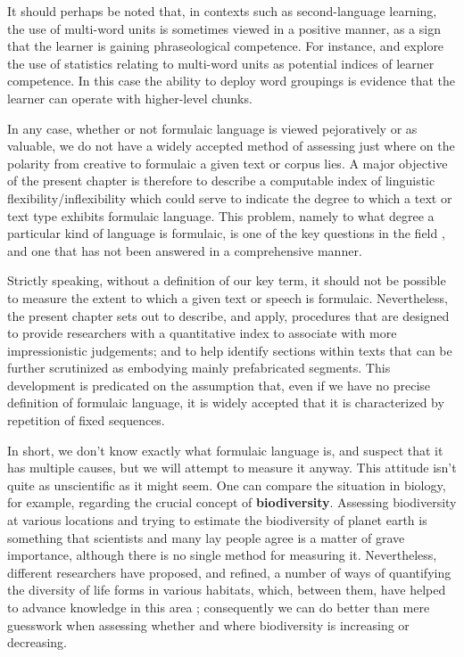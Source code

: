 \documentclass[output=paper]{langscibook}
\begin{document}
It should perhaps be noted that, in contexts such as second-language learning, the use of multi-word units is sometimes viewed in a positive manner, as a sign that the learner is gaining phraseological competence. For instance, \citet{GrangerBestgen2014} and \citet{Leńko-Szymańska2016} explore the use of statistics relating to multi-word units as potential indices of learner competence. In this case the ability to deploy word groupings is evidence that the learner can operate with higher-level chunks.

In any case, whether or not formulaic language is viewed pejoratively or as valuable, we do not have a widely accepted method of assessing just where on the polarity from creative to formulaic a given text or corpus lies. A major objective of the present chapter is therefore to describe a computable index of linguistic flexibility\slash inflexibility which could serve to indicate the degree to which a text or text type exhibits formulaic language. This problem, namely to what degree a particular kind of language is formulaic, is one of the key questions in the field \citep[4]{Wray2002}, and one that has not been answered in a comprehensive manner.

Strictly speaking, without a definition of our key term, it should not be possible to measure the extent to which a given text or speech is formulaic. Nevertheless, the present chapter sets out to describe, and apply, procedures that are designed to provide researchers with a quantitative index to associate with more impressionistic judgements; and to help identify sections within texts that can be further scrutinized as embodying mainly prefabricated segments. This development is predicated on the assumption that, even if we have no precise definition of formulaic language, it is widely accepted that it is characterized by repetition of fixed sequences.

In short, we don't know exactly what formulaic language is, and suspect that it has multiple causes, but we will attempt to measure it anyway. This attitude isn't quite as unscientific as it might seem. One can compare the situation in biology, for example, regarding the crucial concept of \textbf{biodiversity}. Assessing biodiversity at various locations and trying to estimate the biodiversity of planet earth is something that scientists and many lay people agree is a matter of grave importance, although there is no single method for measuring it. Nevertheless, different researchers have proposed, and refined, a number of ways of quantifying the diversity of life forms in various habitats, which, between them, have helped to advance knowledge in this area \citep{Magurran2004}; consequently we can do better than mere guesswork when assessing whether and where biodiversity is increasing or decreasing.
\end{document}
